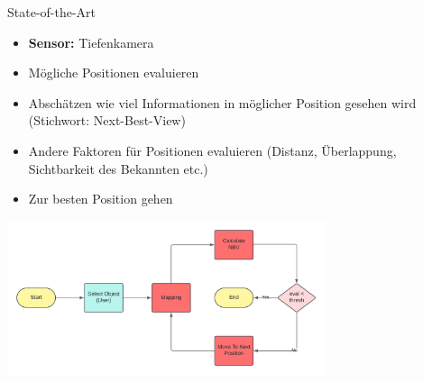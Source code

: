 \documentclass{beamer}
\begin{document}
\begin{frame}{State-of-the-Art}
	\begin{block}{}
		\begin{itemize}
			\item \textbf{Sensor:} Tiefenkamera
			\item Mögliche Positionen evaluieren
			\item Abschätzen wie viel Informationen in möglicher Position gesehen wird (Stichwort: Next-Best-View)
			\item Andere Faktoren für Positionen evaluieren (Distanz, Überlappung, Sichtbarkeit des Bekannten etc.)
			\item Zur besten Position gehen
		\end{itemize}
	\end{block}
	\begin{center}
		\includegraphics[width=0.7\textwidth]{Graphics/flow_chart.png}
	\end{center}
\end{frame}
\end{document}
